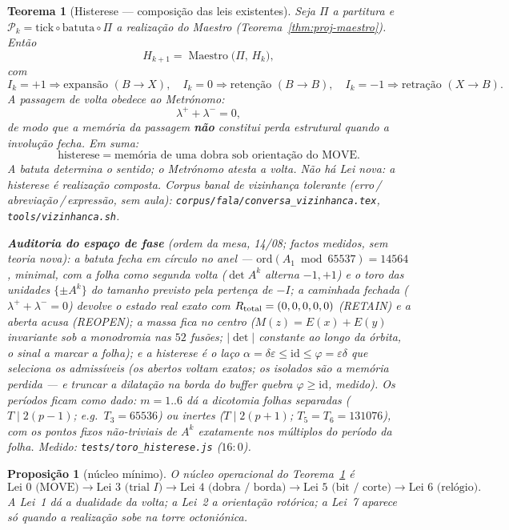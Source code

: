 \documentclass[11pt,a4paper]{article}
\newtheorem{teorema}{Teorema}
\newtheorem{proposicao}{Proposição}
\newcommand{\code}[1]{\texttt{#1}}
\begin{document}
\begin{teorema}[Histerese --- composição das leis existentes]\label{thm:histerese}
Seja $\Pi$ a partitura e $\mathcal{P}_k=\mathrm{tick}\circ\mathrm{batuta}\circ\Pi$
a realização do Maestro (Teorema~\ref{thm:proj-maestro}). Então
\[
\boxed{
H_{k+1}
=
\operatorname{Maestro}\bigl(\Pi,\,H_k\bigr),
}
\]
com
\[
\boxed{
I_k=+1 \Rightarrow \text{expansão }(B\to X),\quad
I_k=0 \Rightarrow \text{retenção }(B\to B),\quad
I_k=-1 \Rightarrow \text{retração }(X\to B).
}
\]
A passagem de volta obedece ao Metrónomo:
\[
\boxed{\lambda^{+} + \lambda^{-} = 0},
\]
de modo que a memória da passagem \textbf{não} constitui perda
estrutural quando a involução fecha. Em suma:
\[
\boxed{
\text{histerese}
=
\text{memória de uma dobra sob orientação do MOVE}.
}
\]
A batuta determina o sentido; o Metrónomo atesta a volta.
\emph{Não há Lei nova:} a histerese é realização composta.
Corpus banal de vizinhança tolerante (erro\,/\,abreviação\,/\,expressão,
sem aula): \code{corpus/fala/conversa\_vizinhanca.tex},
\code{tools/vizinhanca.sh}.

\medskip
\noindent\textbf{Auditoria do espaço de fase} (ordem da mesa, 14/08;
factos medidos, sem teoria nova): a batuta fecha em círculo no anel ---
$\mathrm{ord}(A_1 \bmod 65537)=14564$, minimal, com a \emph{folha} como
segunda volta ($\det A^{k}$ alterna $-1,+1$) e o toro das unidades
$\{\pm A^{k}\}$ do tamanho previsto pela pertença de $-I$; a caminhada
\emph{fechada} ($\lambda^{+}{+}\lambda^{-}=0$) devolve o estado real
exato com $R_{\rm total}=(0,0,0,0,0)$ (RETAIN) e a aberta acusa
(REOPEN); a massa fica no \emph{centro} ($M(z)=E(x){+}E(y)$ invariante
sob a monodromia nas $52$ fusões; $|\det|$ constante ao longo da
órbita, o sinal a marcar a folha); e a histerese é o laço
$\alpha=\delta\varepsilon\leq\mathrm{id}\leq\varphi=\varepsilon\delta$
que \emph{seleciona} os admissíveis (os abertos voltam exatos; os
isolados são a memória perdida --- e truncar a dilatação na borda do
buffer quebra $\varphi\geq\mathrm{id}$, medido). Os períodos ficam como
\emph{dado}: $m=1..6$ dá a dicotomia folhas separadas
($T\mid 2(p{-}1)$; e.g.\ $T_3=65536$) ou inertes ($T\mid 2(p{+}1)$;
$T_5=T_6=131076$), com os pontos fixos não-triviais de $A^{k}$
exatamente nos múltiplos do período da folha.
\emph{Medido:} \code{tests/toro\_histerese.js} ($16{:}0$).
\end{teorema}

\begin{proposicao}[núcleo mínimo]\label{prop:histerese-nucleo}
O núcleo operacional do Teorema~\ref{thm:histerese} é
\[
\boxed{
\text{Lei~0 (MOVE)}
\to
\text{Lei~3 (trial }I\text{)}
\to
\text{Lei~4 (dobra / borda)}
\to
\text{Lei~5 (bit / corte)}
\to
\text{Lei~6 (relógio)}.
}
\]
A Lei~1 dá a dualidade da volta; a Lei~2 a orientação rotórica; a
Lei~7 aparece só quando a realização sobe na torre octoniónica.
\end{proposicao}
\end{document}
